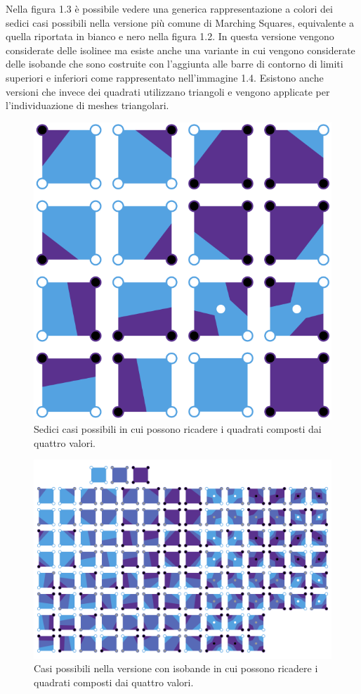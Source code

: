 \documentclass[12pt,a4paper]{report}
\begin{document}
Nella figura 1.3 è possibile vedere una generica rappresentazione a colori dei sedici casi possibili nella versione più comune di Marching Squares, equivalente a quella riportata in bianco e nero nella figura 1.2.
In questa versione vengono considerate delle isolinee ma esiste anche una variante in cui vengono considerate delle isobande che sono costruite con l'aggiunta alle barre di contorno di limiti superiori e inferiori come rappresentato nell'immagine 1.4. \newline Esistono anche versioni che invece dei quadrati utilizzano triangoli e vengono applicate per l'individuazione di meshes triangolari.
\begin{figure}[H]
    \centering
    \includegraphics[scale=0.32]{img/Marching_squares_isolines.svg.png}
    \caption{Sedici casi possibili in cui possono ricadere i quadrati composti dai quattro valori.}
\end{figure}
\begin{figure}[H]
    \centering
    \includegraphics[scale=0.17]{img/Marching_squares_isobands.svg.png}
    \caption{Casi possibili nella versione con isobande in cui possono ricadere i quadrati composti dai quattro valori.}
\end{figure}
\end{document}

